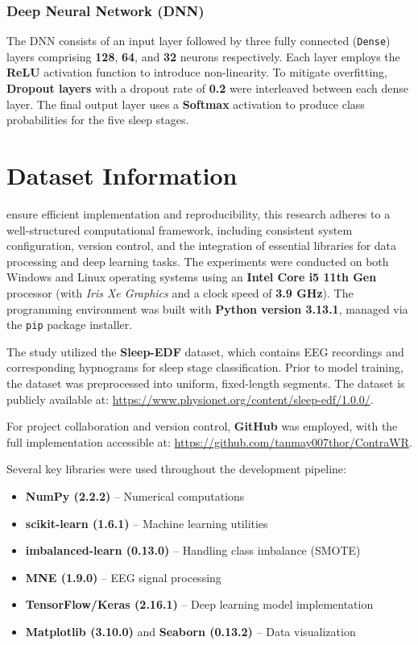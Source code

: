 \subsubsection{Deep Neural Network (DNN)}

The DNN consists of an input layer followed by three fully connected (\texttt{Dense}) layers comprising \textbf{128}, \textbf{64}, and \textbf{32} neurons respectively. Each layer employs the \textbf{ReLU} activation function to introduce non-linearity. To mitigate overfitting, \textbf{Dropout layers} with a dropout rate of \textbf{0.2} were interleaved between each dense layer. The final output layer uses a \textbf{Softmax} activation to produce class probabilities for the five sleep stages.




\section{Dataset Information}


 ensure efficient implementation and reproducibility, this research adheres to a well-structured computational framework, including consistent system configuration, version control, and the integration of essential libraries for data processing and deep learning tasks. The experiments were conducted on both Windows and Linux operating systems using an \textbf{Intel Core i5 11th Gen} processor (with \textit{Iris Xe Graphics} and a clock speed of \textbf{3.9 GHz}). The programming environment was built with \textbf{Python version 3.13.1}, managed via the \texttt{pip} package installer.

The study utilized the \textbf{Sleep-EDF} dataset, which contains EEG recordings and corresponding hypnograms for sleep stage classification. Prior to model training, the dataset was preprocessed into uniform, fixed-length segments. The dataset is publicly available at: \url{https://www.physionet.org/content/sleep-edf/1.0.0/}.

For project collaboration and version control, \textbf{GitHub} was employed, with the full implementation accessible at: \url{https://github.com/tanmay007thor/ContraWR}.

Several key libraries were used throughout the development pipeline:
\begin{itemize}
	\item \textbf{NumPy (2.2.2)} – Numerical computations
	\item \textbf{scikit-learn (1.6.1)} – Machine learning utilities
	\item \textbf{imbalanced-learn (0.13.0)} – Handling class imbalance (SMOTE)
	\item \textbf{MNE (1.9.0)} – EEG signal processing
	\item \textbf{TensorFlow/Keras (2.16.1)} – Deep learning model implementation
	\item \textbf{Matplotlib (3.10.0)} and \textbf{Seaborn (0.13.2)} – Data visualization
\end{itemize}

